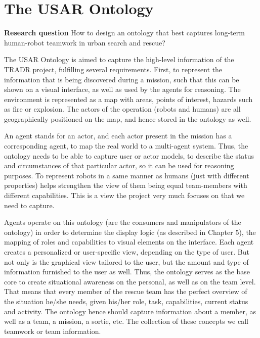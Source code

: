 \section{The USAR Ontology}
\textbf{Research question} How to design an ontology that best captures long-term human-robot teamwork in urban search and rescue? 

The USAR Ontology is aimed to capture the high-level information of the TRADR project, fulfilling several requirements. First, to represent the information that is being discovered during a mission, such that this can be shown on a visual interface, as well as used by the agents for reasoning. 
The environment is represented as a map with areas, points of interest, hazards such as fire or explosion. The actors of the operation (robots and humans) are all geographically positioned on the map, and hence stored in the ontology as well. 

An agent stands for an actor, and each actor present in the mission has a corresponding agent, to map the real world to a multi-agent system. Thus, the ontology needs to be able to capture user or actor models, to describe the status and circumstances of that particular actor, so it can be used for reasoning purposes.
To represent robots in a same manner as humans (just with different properties) helps strengthen the view of them being equal team-members with different capabilities. This is a view the project very much focuses on that we need to capture.

Agents operate on this ontology (are the consumers and manipulators of the ontology) in order to determine the display logic (as described in Chapter 5), the mapping of roles and capabilities to visual elements on the interface. Each agent creates a personalized or user-specific view, depending on the type of user. But not only is the graphical view tailored to the user, but the amount and type of information furnished to the user as well. Thus, the ontology serves as the base core to create situational awareness on the personal, as well as on the team level. That means that every member of the rescue team has the perfect overview of the situation he/she needs, given his/her role, task, capabilities, current status and activity. The ontology hence should capture information about a member, as well as a team, a mission, a sortie, etc. The collection of these concepts we call teamwork or team information.
 
